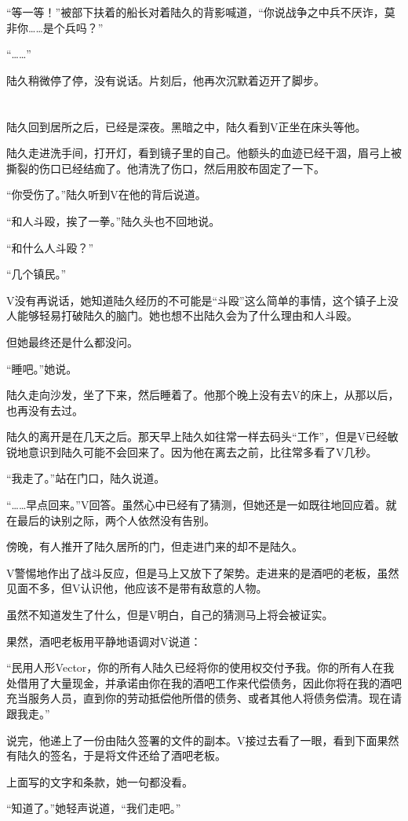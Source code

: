 “等一等！”被部下扶着的船长对着陆久的背影喊道，“你说战争之中兵不厌诈，莫非你……是个兵吗？”

“……”

陆久稍微停了停，没有说话。片刻后，他再次沉默着迈开了脚步。

\section*{}

陆久回到居所之后，已经是深夜。黑暗之中，陆久看到V正坐在床头等他。

陆久走进洗手间，打开灯，看到镜子里的自己。他额头的血迹已经干涸，眉弓上被撕裂的伤口已经结痂了。他清洗了伤口，然后用胶布固定了一下。

“你受伤了。”陆久听到V在他的背后说道。

“和人斗殴，挨了一拳。”陆久头也不回地说。

“和什么人斗殴？”

“几个镇民。”

V没有再说话，她知道陆久经历的不可能是“斗殴”这么简单的事情，这个镇子上没人能够轻易打破陆久的脑门。她也想不出陆久会为了什么理由和人斗殴。

但她最终还是什么都没问。

“睡吧。”她说。

陆久走向沙发，坐了下来，然后睡着了。他那个晚上没有去V的床上，从那以后，也再没有去过。

陆久的离开是在几天之后。那天早上陆久如往常一样去码头“工作”，但是V已经敏锐地意识到陆久可能不会回来了。因为他在离去之前，比往常多看了V几秒。

“我走了。”站在门口，陆久说道。

“……早点回来。”V回答。虽然心中已经有了猜测，但她还是一如既往地回应着。就在最后的诀别之际，两个人依然没有告别。

傍晚，有人推开了陆久居所的门，但走进门来的却不是陆久。

V警惕地作出了战斗反应，但是马上又放下了架势。走进来的是酒吧的老板，虽然见面不多，但V认识他，他应该不是带有敌意的人物。

虽然不知道发生了什么，但是V明白，自己的猜测马上将会被证实。

果然，酒吧老板用平静地语调对V说道：

“民用人形Vector，你的所有人陆久已经将你的使用权交付予我。你的所有人在我处借用了大量现金，并承诺由你在我的酒吧工作来代偿债务，因此你将在我的酒吧充当服务人员，直到你的劳动抵偿他所借的债务、或者其他人将债务偿清。现在请跟我走。”

说完，他递上了一份由陆久签署的文件的副本。V接过去看了一眼，看到下面果然有陆久的签名，于是将文件还给了酒吧老板。

上面写的文字和条款，她一句都没看。

“知道了。”她轻声说道，“我们走吧。”